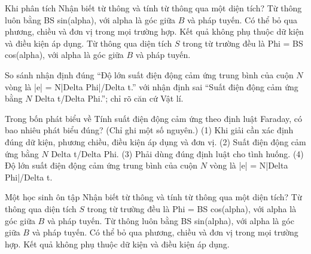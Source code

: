 \begin{ex}
Khi phân tích Nhận biết từ thông và tính từ thông qua một diện tích?
\choice
{Từ thông luôn bằng BS sin(alpha), với alpha là góc giữa $B$ và pháp tuyến.}
{Có thể bỏ qua phương, chiều và đơn vị trong mọi trường hợp.}
{Kết quả không phụ thuộc dữ kiện và điều kiện áp dụng.}
{\True Từ thông qua diện tích $S$ trong từ trường đều là Phi = BS cos(alpha), với alpha là góc giữa $B$ và pháp tuyến.}
\end{ex}

\begin{bt}
So sánh nhận định đúng “Độ lớn suất điện động cảm ứng trung bình của cuộn $N$ vòng là |e| = N|Delta Phi|/Delta t.” với nhận định sai “Suất điện động cảm ứng bằng $N$ Delta t/Delta Phi.”; chỉ rõ căn cứ Vật lí.
\end{bt}

\begin{ex}
Trong bốn phát biểu về Tính suất điện động cảm ứng theo định luật Faraday, có bao nhiêu phát biểu đúng? (Chỉ ghi một số nguyên.) (1) Khi giải cần xác định đúng dữ kiện, phương chiều, điều kiện áp dụng và đơn vị. (2) Suất điện động cảm ứng bằng $N$ Delta t/Delta Phi. (3) Phải dùng đúng định luật cho tình huống. (4) Độ lớn suất điện động cảm ứng trung bình của cuộn $N$ vòng là |e| = N|Delta Phi|/Delta t.
\end{ex}

\begin{ex}
Một học sinh ôn tập Nhận biết từ thông và tính từ thông qua một diện tích?
\choice
{\True Từ thông qua diện tích $S$ trong từ trường đều là Phi = BS cos(alpha), với alpha là góc giữa $B$ và pháp tuyến.}
{Từ thông luôn bằng BS sin(alpha), với alpha là góc giữa $B$ và pháp tuyến.}
{Có thể bỏ qua phương, chiều và đơn vị trong mọi trường hợp.}
{Kết quả không phụ thuộc dữ kiện và điều kiện áp dụng.}
\end{ex}

